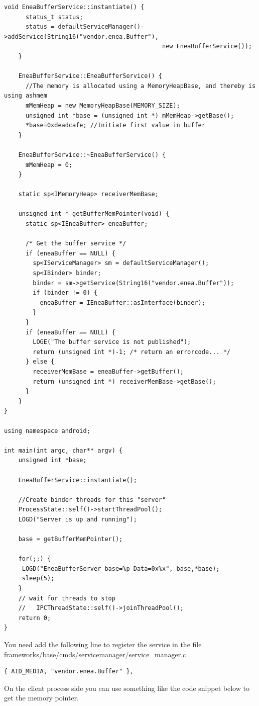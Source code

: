 \documentclass[a4paper,11pt]{article}
\begin{document}
\begin{appendices}
\begin{lstlisting}[caption=Server command: EneaBufferServer.cpp,
    label={EneaBufferServer}]
    void EneaBufferService::instantiate() {
      status_t status;
      status = defaultServiceManager()->addService(String16("vendor.enea.Buffer"),
                                            new EneaBufferService());
    }

    EneaBufferService::EneaBufferService() {
      //The memory is allocated using a MemoryHeapBase, and thereby is using ashmem
      mMemHeap = new MemoryHeapBase(MEMORY_SIZE);
      unsigned int *base = (unsigned int *) mMemHeap->getBase();
      *base=0xdeadcafe; //Initiate first value in buffer
    }

    EneaBufferService::~EneaBufferService() {
      mMemHeap = 0;
    }

    static sp<IMemoryHeap> receiverMemBase;

    unsigned int * getBufferMemPointer(void) {
      static sp<IEneaBuffer> eneaBuffer;

      /* Get the buffer service */
      if (eneaBuffer == NULL) {
        sp<IServiceManager> sm = defaultServiceManager();
        sp<IBinder> binder;
        binder = sm->getService(String16("vendor.enea.Buffer"));
        if (binder != 0) {
          eneaBuffer = IEneaBuffer::asInterface(binder);
        }
      }
      if (eneaBuffer == NULL) {
        LOGE("The buffer service is not published");
        return (unsigned int *)-1; /* return an errorcode... */
      } else {
        receiverMemBase = eneaBuffer->getBuffer();
        return (unsigned int *) receiverMemBase->getBase();
      }
    }
}

using namespace android;

int main(int argc, char** argv) {
    unsigned int *base;

    EneaBufferService::instantiate();

    //Create binder threads for this "server"
    ProcessState::self()->startThreadPool();
    LOGD("Server is up and running");

    base = getBufferMemPointer();

    for(;;) {
     LOGD("EneaBufferServer base=%p Data=0x%x", base,*base);
     sleep(5);
    }
    // wait for threads to stop
    //   IPCThreadState::self()->joinThreadPool();
    return 0;
}
\end{lstlisting}
You need add the following line to register the service in the file
frameworks/base/cmds/servicemanager/service_manager.c

\begin{lstlisting}
{ AID_MEDIA, "vendor.enea.Buffer" },
\end{lstlisting}
On the client process side you can use something like the code snippet below to get the memory pointer.


\end{appendices}
\end{document}
